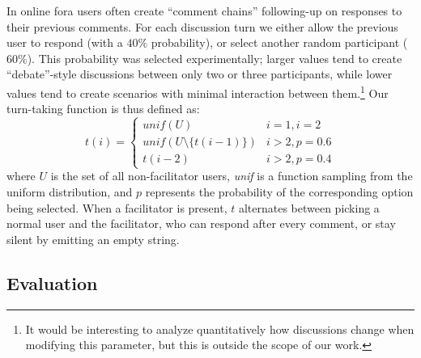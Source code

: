 In online fora users often create ``comment chains'' following-up on responses to their previous comments. For each discussion turn we either allow the previous user to respond (with a $40\%$ probability), or select another random participant ($60\%$). This probability was selected experimentally; larger values tend to create ``debate''-style discussions between only two or three participants, while lower values tend to create scenarios with minimal interaction between them.\footnote{It would be interesting to analyze quantitatively how discussions change when modifying this parameter, but this is outside the scope of our work.} Our turn-taking function is thus defined as:
\[
t(i) = \left\{
\begin{array}{ll}
	\textit{unif}(U) & i=1, i=2\\
	\textit{unif}(U \setminus \{t(i-1)\}) & i > 2, p=0.6 \\
	t(i-2) & i > 2, p=0.4 
\end{array} 
\right.
\]
\noindent where $U$ is the set of all non-facilitator users, \textit{unif} is a function sampling from the uniform distribution, and $p$ represents the probability of the corresponding option being selected. When a facilitator is present, $t$ alternates between picking a normal user and the facilitator, who can respond after every comment, or stay silent by emitting an empty string. 


\subsection{Evaluation}
\label{ssec:methodology:evaluation}

